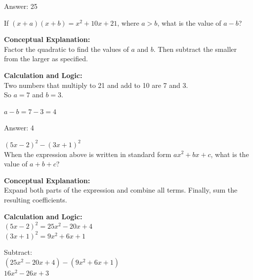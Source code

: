 \documentclass[11pt,paper=a4,answers]{exam}
\begin{document}
\begin{questions}
\begin{solution}
Answer: \colorbox{yellow!100}{25}
\end{solution}

\vspace{40pt}

\question
If $(x + a)(x + b) = x^2 + 10x + 21$, where $a > b$, what is the value of $a - b$?

\begin{solution}
\textbf{Conceptual Explanation:} \\
Factor the quadratic to find the values of $a$ and $b$. Then subtract the smaller from the larger as specified.

\vspace{20pt}

\textbf{Calculation and Logic:} \\
Two numbers that multiply to 21 and add to 10 are 7 and 3. \\
So $a = 7$ and $b = 3$.

\vspace{10pt}

$a - b = 7 - 3 = 4$

\vspace{25pt}

Answer: \colorbox{yellow!100}{4}
\end{solution}

\vspace{40pt}

\question
$(5x - 2)^2 - (3x + 1)^2$ \\
When the expression above is written in standard form $ax^2 + bx + c$, what is the value of $a + b + c$?

\begin{solution}
\textbf{Conceptual Explanation:} \\
Expand both parts of the expression and combine all terms. Finally, sum the resulting coefficients.

\vspace{20pt}

\textbf{Calculation and Logic:} \\
$(5x - 2)^2 = 25x^2 - 20x + 4$ \\
$(3x + 1)^2 = 9x^2 + 6x + 1$

\vspace{10pt}

Subtract: \\
$(25x^2 - 20x + 4) - (9x^2 + 6x + 1)$ \\
$16x^2 - 26x + 3$


\end{solution}
\end{questions}
\end{document}

